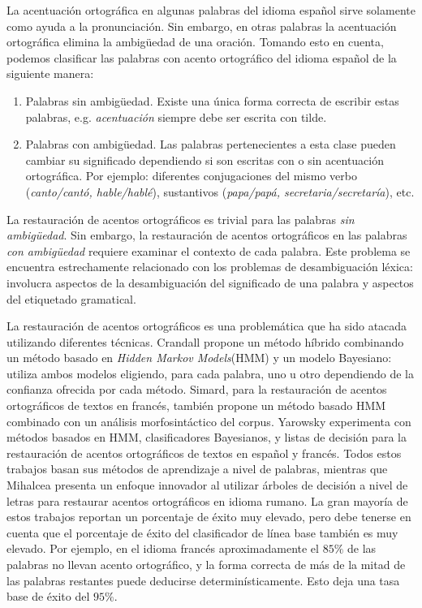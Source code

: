 \documentclass[runningheads,a4paper]{llncs}
\begin{document}
La acentuación ortográfica en algunas palabras del idioma español sirve solamente como ayuda a la pronunciación. Sin embargo, en otras palabras la acentuación ortográfica elimina la ambigüedad de una oración. Tomando esto en cuenta, podemos clasificar las palabras con acento ortográfico del idioma español de la siguiente manera\cite{CRANDALL95}:
\begin{enumerate}
\item{Palabras sin ambigüedad}. Existe una única forma correcta de escribir estas palabras, e.g. \emph{acentuación} siempre debe ser escrita con tilde.
\item{Palabras con ambigüedad}. Las palabras pertenecientes a esta clase pueden cambiar su significado dependiendo si son escritas con o sin acentuación ortográfica. Por ejemplo: diferentes conjugaciones del mismo verbo (\emph{canto/cantó, hable/hablé}), sustantivos (\emph{papa/papá, secretaria/secretaría}), etc.
\end{enumerate}

La restauración de acentos ortográficos es trivial para las palabras \emph{sin ambig\"uedad}. Sin embargo, la restauración de acentos ortográficos en las palabras \emph{con ambig\"uedad} requiere examinar el contexto de cada palabra. Este problema se encuentra estrechamente relacionado con los problemas de desambiguación léxica: involucra aspectos de la desambiguación del significado de una palabra y aspectos del etiquetado gramatical. 

La restauración de acentos ortográficos es una problemática que ha sido atacada utilizando diferentes técnicas. Crandall\cite{CRANDALL95} propone un método híbrido combinando un método basado en \emph{Hidden Markov Models}(HMM) y un modelo Bayesiano: utiliza ambos modelos eligiendo, para cada palabra, uno u otro dependiendo de la confianza ofrecida por cada método. Simard\cite{SIMARD98}, para la restauración de acentos ortográficos de textos en francés, también propone un método basado HMM combinado con un análisis morfosintáctico del corpus. Yarowsky\cite{YAROWSKY94,YAROWSKY94-2} experimenta con métodos basados en HMM, clasificadores Bayesianos, y listas de decisión para la restauración de acentos ortográficos de textos en español y francés. Todos estos trabajos basan sus métodos de aprendizaje a nivel de palabras, mientras que Mihalcea\cite{MIHALCEA02} presenta un enfoque innovador al utilizar árboles de decisión a nivel de letras para restaurar acentos ortográficos en idioma rumano. La gran mayoría de estos trabajos reportan un porcentaje de éxito muy elevado, pero debe tenerse en cuenta que el porcentaje de éxito del clasificador de línea base también es muy elevado. Por ejemplo, en el idioma francés aproximadamente el $85\%$ de las palabras no llevan acento ortográfico, y la forma correcta de más de la mitad de las palabras restantes puede deducirse determinísticamente. Esto deja una tasa base de éxito del $95\%$\cite{SIMARD98}.
\end{document}

